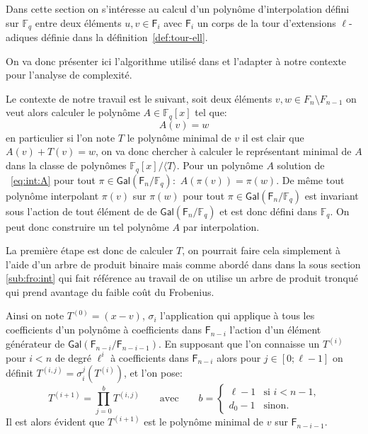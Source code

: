 \documentclass[10pt,a4paper]{book}
\theoremstyle{plain}
\theoremstyle{definition}
\theoremstyle{definition}
\theoremstyle{definition}
\theoremstyle{definition}
\theoremstyle{remark}
\theoremstyle{remark}
\theoremstyle{definition}
\begin{document}
Dans cette section on s'intéresse au calcul d'un polynôme d'interpolation défini
 sur $\mathbb{F}_q$ entre deux éléments $u,v \in \mathsf{F}_i$ avec 
 $\mathsf{F}_i$ un corps de la tour d'extensions $\ell$-adiques 
  définie dans la définition~\ref{def:tour-ell}.  
  
  
 On va donc présenter ici l'algorithme utilisé dans \cite[8.7]{DeFeo10} et
 l'adapter à notre contexte pour l'analyse de complexité. 


Le contexte de notre travail est le suivant, soit deux éléments $v,w \in F_n
\setminus F_{n-1}$ on veut alors calculer le polynôme $A \in \mathbb{F}_q[x]$ 
tel que:
\begin{equation}
\label{eq:int:A}
A(v)=w
\end{equation}
en particulier si l'on note $T$ le polynôme minimal de $v$ il est clair que 
 $A(v)+T(v)=w$, on va donc chercher à calculer le représentant minimal de 
$A$ dans la classe de polynômes $\mathbb{F}_q[x]/ \langle T \rangle$.
Pour un polynôme $A$ solution de ~\ref{eq:int:A} pour tout 
$\pi \in \mathsf{Gal}(\mathsf{F}_n / \mathbb{F}_q):$ $A(\pi(v))=\pi(w)$. De même
tout polynôme interpolant $\pi(v)$ sur $\pi(w)$ pour tout 
$\pi \in \mathsf{Gal}(\mathsf{F}_n / \mathbb{F}_q)$ est invariant sous l'action
de tout élément de de $\mathsf{Gal}(\mathsf{F}_n / \mathbb{F}_q)$ et est donc 
défini dans $\mathbb{F}_q$. On peut donc construire un tel polynôme $A$ par 
interpolation. 

La première étape est donc de calculer $T$, on pourrait faire  cela simplement 
à l'aide d'un arbre de produit binaire mais comme abordé dans dans la sous 
section \ref{sub:fro:int} qui fait référence au travail de \cite[8.7]{DeFeo10}
on utilise un arbre de produit tronqué qui prend avantage du faible coût du 
Frobenius.

Ainsi on note $T^{(0)}=(x-v)$, $\sigma_i$ l'application qui applique à tous les
 coefficients d'un polynôme à coefficients dans $\mathsf{F}_{n-i}$ l'action 
 d'un élément générateur de $\mathsf{Gal}(\mathsf{F}_{n-i} / \mathsf{F}_{n-i-1})$. En 
 supposant que l'on connaisse un $T^{(i)}$ pour $i < n$ de degré $\ell^i$ à 
 coefficients dans $\mathsf{F}_{n-i}$ alors pour $j \in [0 ; \ell-1]$ on définit
 $T^{(i,j)}=\sigma_i^j(T^{(i)})$, et l'on pose:  
\begin{equation*}
T^{(i+1)}=\prod_{j=0}^bT^{(i,j)} \qquad\text{avec}\qquad
  b = \begin{cases}
    \ell-1 &\text{si $i<n-1$,}\\
    d_0-1 &\text{sinon.}
  \end{cases}
\end{equation*}
Il est alors évident que $T^{(i+1)}$ est le polynôme minimal de $v$ sur 
$\mathsf{F}_{n-i-1}$.
\end{document}
